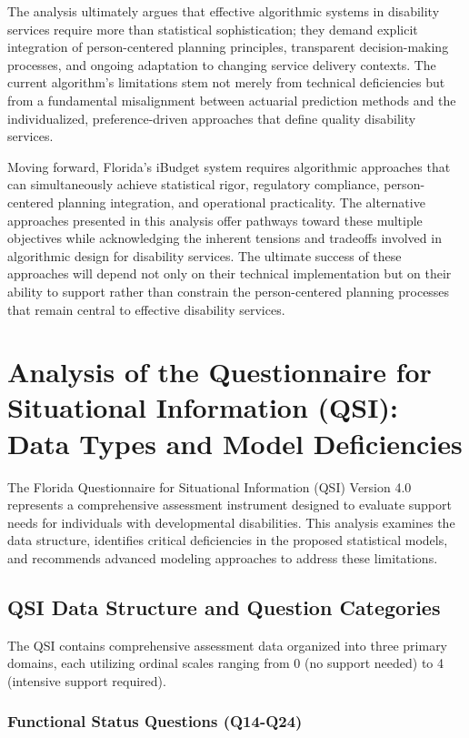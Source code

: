 The analysis ultimately argues that effective algorithmic systems in disability services require more than statistical sophistication; they demand explicit integration of person-centered planning principles, transparent decision-making processes, and ongoing adaptation to changing service delivery contexts. The current algorithm's limitations stem not merely from technical deficiencies but from a fundamental misalignment between actuarial prediction methods and the individualized, preference-driven approaches that define quality disability services.

Moving forward, Florida's iBudget system requires algorithmic approaches that can simultaneously achieve statistical rigor, regulatory compliance, person-centered planning integration, and operational practicality. The alternative approaches presented in this analysis offer pathways toward these multiple objectives while acknowledging the inherent tensions and tradeoffs involved in algorithmic design for disability services. The ultimate success of these approaches will depend not only on their technical implementation but on their ability to support rather than constrain the person-centered planning processes that remain central to effective disability services.


\section{Analysis of the Questionnaire for Situational Information (QSI): Data Types and Model Deficiencies}

The Florida Questionnaire for Situational Information (QSI) Version 4.0 represents a comprehensive assessment instrument designed to evaluate support needs for individuals with developmental disabilities. This analysis examines the data structure, identifies critical deficiencies in the proposed statistical models, and recommends advanced modeling approaches to address these limitations.

\subsection{QSI Data Structure and Question Categories}

The QSI contains comprehensive assessment data organized into three primary domains, each utilizing ordinal scales ranging from 0 (no support needed) to 4 (intensive support required).

\subsubsection{Functional Status Questions (Q14-Q24)}


